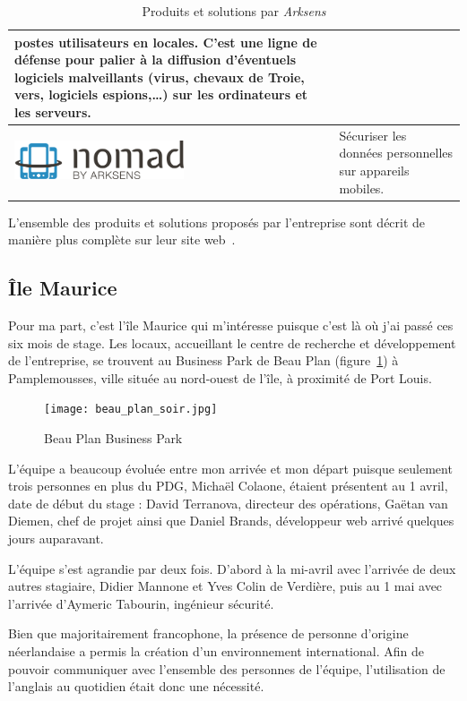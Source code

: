 \documentclass[a4paper,10pt, twoside]{report}
\begin{document}
\begin{spacing}{1.2}
\begin{table}[h!]
\begin{tabular}{m{6cm}m{6cm}}
    postes utilisateurs en locales. C'est une ligne de d\'efense pour palier
    \`a la diffusion d'\'eventuels logiciels malveillants (virus, chevaux de
    Troie, vers, logiciels espions,\ldots{}) sur les ordinateurs et les
    serveurs.\\
    \hline
    \includegraphics[width=5cm, fbox]{produits/nomad.png} & S\'ecuriser les
    donn\'ees personnelles sur appareils mobiles.\\
    \hline
  \end{tabular}
  \caption{\label{tabProduits} Produits et solutions par \textit{Arksens}}
\end{table}

L'ensemble des produits et solutions propos\'es par l'entreprise sont d\'ecrit
de mani\`ere plus compl\`ete sur leur site web~\cite{refArksens}.

\subsection{\^Ile Maurice}
Pour ma part, c'est l'\^ile Maurice qui m'int\'eresse puisque c'est l\`a o\`u
j'ai pass\'e ces six mois de stage. Les locaux, accueillant le centre de
recherche et d\'eveloppement de l'entreprise, se trouvent au Business Park de
Beau Plan (figure~\ref{beauPlan}) \`a Pamplemousses, ville situ\'ee au
nord-ouest de l'\^ile, \`a proximit\'e de Port Louis.

\begin{figure}[h!]
  \centering
  \texttt{[image: beau\_plan\_soir.jpg]}
  \caption{\label{beauPlan} Beau Plan Business Park}
\end{figure}

L'\'equipe a beaucoup \'evolu\'ee entre mon arriv\'ee et mon d\'epart puisque
seulement trois personnes en plus du PDG, Micha\"el Colaone, \'etaient
pr\'esentent au 1 avril, date de d\'ebut du stage : David Terranova,
directeur des op\'erations, Ga\"etan van Diemen, chef de projet ainsi que
Daniel Brands, d\'eveloppeur web arriv\'e quelques jours auparavant.

L'\'equipe s'est agrandie par deux fois. D'abord \`a la mi-avril avec
l'arriv\'ee de deux autres stagiaire, Didier Mannone et
Yves Colin de Verdi\`ere, puis au 1 mai avec l'arriv\'ee d'Aymeric
Tabourin, ing\'enieur s\'ecurit\'e.

Bien que majoritairement francophone, la pr\'esence de personne d'origine
n\'eerlandaise a permis la cr\'eation d'un environnement international. Afin
de pouvoir communiquer avec l'ensemble des personnes de l'\'equipe,
l'utilisation de l'anglais au quotidien \'etait donc une n\'ecessit\'e.


\end{spacing}
\end{document}

